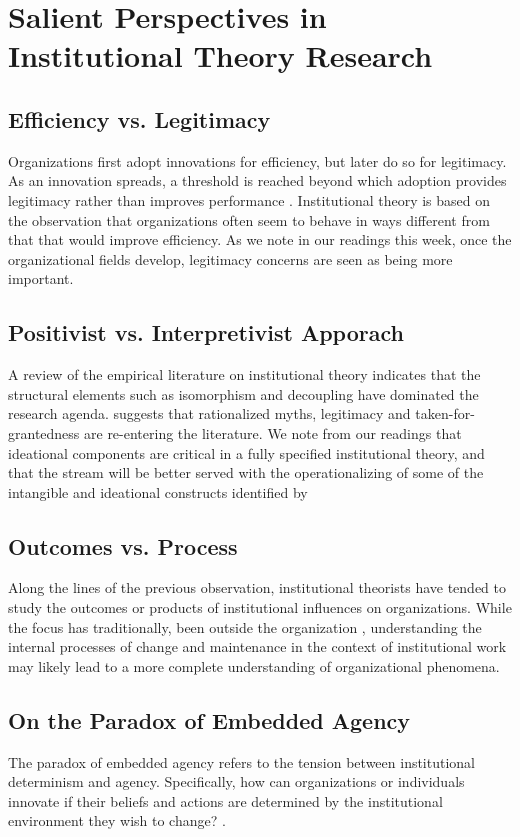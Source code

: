 \documentclass[12pt]{article}
\begin{document}
\section{Salient Perspectives in Institutional Theory Research}

\subsection{Efficiency vs. Legitimacy}
Organizations first adopt innovations for efficiency, but later do so for legitimacy. As an innovation spreads, a threshold is reached beyond which adoption provides legitimacy rather than improves performance \citep{Meyer1977}. Institutional theory is based on the observation that organizations often seem to behave in ways different from that that would improve efficiency. As we note in our readings this week, once the organizational fields develop, legitimacy concerns are seen as being more important.

\subsection{Positivist vs. Interpretivist Apporach}
A review of the empirical literature on institutional theory indicates that the structural elements such as isomorphism and decoupling have dominated the research agenda\citep{Suddaby2010}. \cite{Suddaby2010} suggests that rationalized myths, legitimacy and taken-for-grantedness are re-entering the literature. We note from our readings that ideational components are critical in a fully specified institutional theory, and that the stream will be better served with the operationalizing of some of the intangible and ideational constructs identified by \cite{Suddaby2010}

\subsection{Outcomes vs. Process}
Along the lines of the previous observation, institutional theorists have tended to study the outcomes or products of institutional influences on organizations. While the focus has traditionally, been outside the organization \citep{Suddaby2010}, understanding the internal processes of change and maintenance in the context of institutional work may likely lead to a more complete understanding of organizational phenomena.

\subsection{On the Paradox of Embedded Agency}
The paradox of embedded agency refers  to the tension between institutional determinism and agency. Specifically, how can organizations or individuals innovate if their beliefs and actions are determined by the institutional environment they wish to change? \citep{Scott1987}. 
\end{document}
